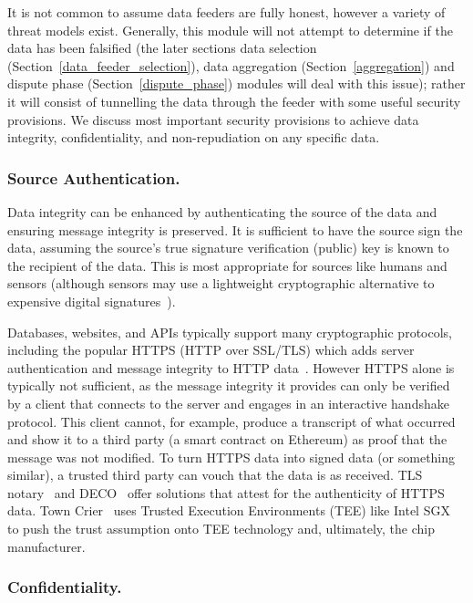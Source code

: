 It is not common to assume data feeders are fully honest, however a variety of threat models exist. Generally, this module will not attempt to determine if the data has been falsified (the later sections data selection (Section~\ref{data_feeder_selection}), data aggregation (Section~\ref{aggregation}) and dispute phase (Section~\ref{dispute_phase}) modules will deal with this issue); rather it will consist of tunnelling the data through the feeder with some useful security provisions. We discuss most important security provisions to achieve data integrity, confidentiality, and non-repudiation on any specific data. 


\subsubsection{Source Authentication.}\label{source_authentication}
Data integrity can be enhanced by authenticating the source of the data and ensuring message integrity is preserved. It is sufficient to have the source sign the data, assuming the source's true signature verification (\ie public) key is known to the recipient of the data. This is most appropriate for sources like humans and sensors (although sensors may use a lightweight cryptographic alternative to expensive digital signatures~\cite{sallam2018survey}).

Databases, websites, and APIs typically support many cryptographic protocols, including the popular HTTPS (HTTP over SSL/TLS) which adds server authentication and message integrity to HTTP data~\cite{clark2013sok}. However HTTPS alone is typically not sufficient, as the message integrity it provides can only be verified by a client that connects to the server and engages in an interactive handshake protocol. This client cannot, for example, produce a transcript of what occurred and show it to a third party (\eg a smart contract on Ethereum) as proof that the message was not modified. To turn HTTPS data into signed data (or something similar), a trusted third party can vouch that the data is as received. TLS notary~\cite{tlsnotary} and DECO~\cite{zhang2019deco} offer solutions that attest for the authenticity of HTTPS data. Town Crier~\cite{zhang2016town} uses Trusted Execution Environments (TEE) like Intel SGX~\cite{costan2016intel} to push the trust assumption onto TEE technology and, ultimately, the chip manufacturer.

\subsubsection{Confidentiality.}

